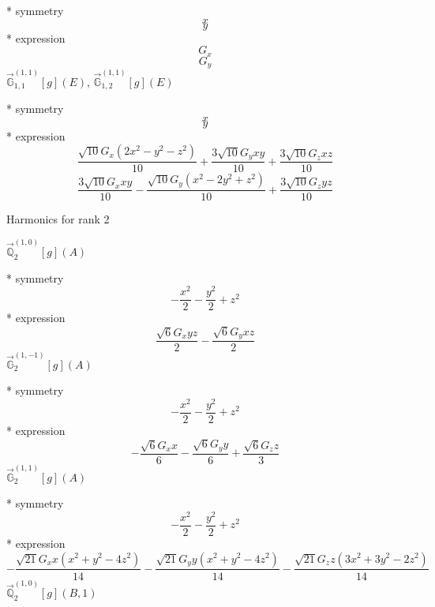 \documentclass[fleqn,8pt]{jsarticle}
\begin{document}
\noindent\quad ** symmetry
\begin{dmath*}
x
\end{dmath*}
\begin{dmath*}
y
\end{dmath*}
\noindent\quad ** expression
\begin{dmath*}
G_{x}
\end{dmath*}
\begin{dmath*}
G_{y}
\end{dmath*}
\noindent\quad $\vec{\mathbb{G}}_{1,1}^{(1,1)}[g](E)$, $\vec{\mathbb{G}}_{1,2}^{(1,1)}[g](E)$

\noindent\quad ** symmetry
\begin{dmath*}
x
\end{dmath*}
\begin{dmath*}
y
\end{dmath*}
\noindent\quad ** expression
\begin{dmath*}
\frac{\sqrt{10} G_{x} \left(2 x^{2} - y^{2} - z^{2}\right)}{10} + \frac{3 \sqrt{10} G_{y} x y}{10} + \frac{3 \sqrt{10} G_{z} x z}{10}
\end{dmath*}
\begin{dmath*}
\frac{3 \sqrt{10} G_{x} x y}{10} - \frac{\sqrt{10} G_{y} \left(x^{2} - 2 y^{2} + z^{2}\right)}{10} + \frac{3 \sqrt{10} G_{z} y z}{10}
\end{dmath*}

\noindent * Harmonics for rank 2

\noindent\quad $\vec{\mathbb{Q}}_{2}^{(1,0)}[g](A)$

\noindent\quad ** symmetry
\begin{dmath*}
- \frac{x^{2}}{2} - \frac{y^{2}}{2} + z^{2}
\end{dmath*}
\noindent\quad ** expression
\begin{dmath*}
\frac{\sqrt{6} G_{x} y z}{2} - \frac{\sqrt{6} G_{y} x z}{2}
\end{dmath*}
\noindent\quad $\vec{\mathbb{G}}_{2}^{(1,-1)}[g](A)$

\noindent\quad ** symmetry
\begin{dmath*}
- \frac{x^{2}}{2} - \frac{y^{2}}{2} + z^{2}
\end{dmath*}
\noindent\quad ** expression
\begin{dmath*}
- \frac{\sqrt{6} G_{x} x}{6} - \frac{\sqrt{6} G_{y} y}{6} + \frac{\sqrt{6} G_{z} z}{3}
\end{dmath*}
\noindent\quad $\vec{\mathbb{G}}_{2}^{(1,1)}[g](A)$

\noindent\quad ** symmetry
\begin{dmath*}
- \frac{x^{2}}{2} - \frac{y^{2}}{2} + z^{2}
\end{dmath*}
\noindent\quad ** expression
\begin{dmath*}
- \frac{\sqrt{21} G_{x} x \left(x^{2} + y^{2} - 4 z^{2}\right)}{14} - \frac{\sqrt{21} G_{y} y \left(x^{2} + y^{2} - 4 z^{2}\right)}{14} - \frac{\sqrt{21} G_{z} z \left(3 x^{2} + 3 y^{2} - 2 z^{2}\right)}{14}
\end{dmath*}
\noindent\quad $\vec{\mathbb{Q}}_{2}^{(1,0)}[g](B,1)$
\end{document}
